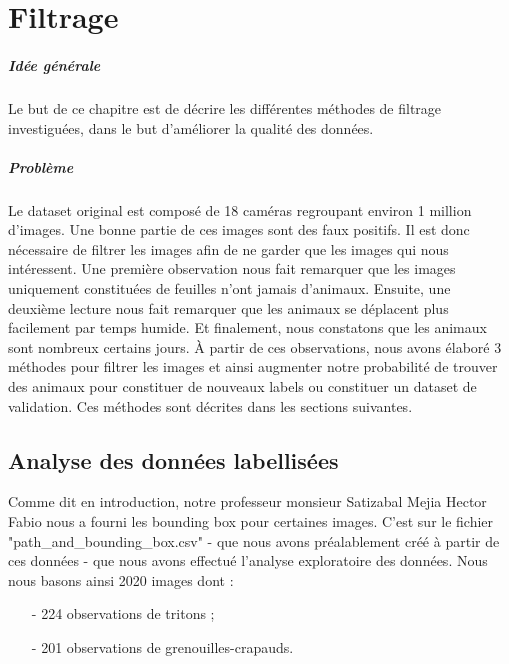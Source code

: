 \chapter{Filtrage}

\paragraph*{Idée générale}
Le but de ce chapitre est de décrire les différentes méthodes de filtrage investiguées, dans le but d'améliorer la qualité des données.

\paragraph*{Problème}
Le dataset original est composé de 18 caméras regroupant environ 1 million d'images. Une bonne partie de ces images sont des faux positifs. Il est donc nécessaire de filtrer les images afin de ne garder que les images qui nous intéressent. Une première observation nous fait remarquer que les images uniquement constituées de feuilles n'ont jamais d'animaux. Ensuite, une deuxième lecture nous fait remarquer que les animaux se déplacent plus facilement par temps humide. Et finalement, nous constatons que les animaux sont nombreux certains jours. À partir de ces observations, nous avons élaboré 3 méthodes pour filtrer les images et ainsi augmenter notre probabilité de trouver des animaux pour constituer de nouveaux labels ou constituer un dataset de validation.
Ces méthodes sont décrites dans les sections suivantes.


\section{Analyse des données labellisées}

Comme dit en introduction, notre professeur monsieur Satizabal Mejia Hector Fabio nous a fourni les bounding box pour certaines images. C'est sur le fichier "path\_and\_bounding\_box.csv" - que nous avons préalablement créé à partir de ces données - que nous avons effectué l'analyse exploratoire des données. Nous nous basons ainsi 2020 images dont :

\begin{enumerate}
    \item[-] 224 observations de tritons ;
    \item[-] 201 observations de grenouilles-crapauds.
\end{enumerate}

